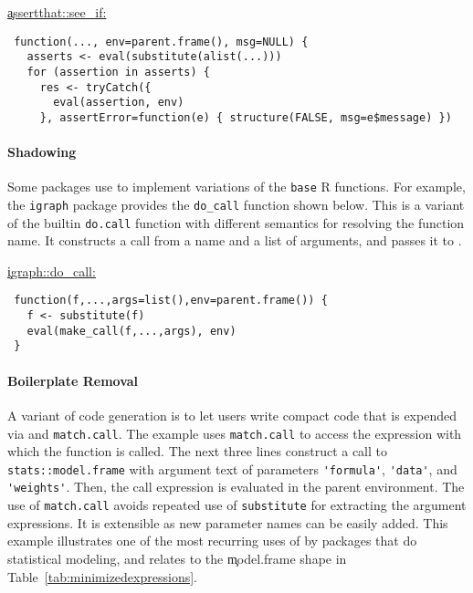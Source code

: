 \documentclass[review,screen,acmsmall]{acmart}%
\renewcommand{\k}[1]{\lstinline |#1|\xspace}
\begin{document}
\begin{minipage}{.95\textwidth}
  \medskip\underline{\c {assertthat::see\_if}:}
\begin{lstlisting}
 function(..., env=parent.frame(), msg=NULL) {
   asserts <- eval(substitute(alist(...)))
   for (assertion in asserts) {
     res <- tryCatch({
       eval(assertion, env)
     }, assertError=function(e) { structure(FALSE, msg=e$message) })
\end{lstlisting}\medskip
\end{minipage}

\paragraph{Shadowing}
Some packages use \eval to implement variations of the \k{base} R functions.
For example, the \k{igraph} package provides the \k{do_call} function shown
below. This is a variant of the builtin \k{do.call} function with different
semantics for resolving the function name.
It constructs a call from a name and a list of arguments, and passes it to \eval.

\begin{minipage}{.95\textwidth}
  \medskip\underline{\c{igraph::do\_call}:}
\begin{lstlisting}
 function(f,...,args=list(),env=parent.frame()) {
   f <- substitute(f)
   eval(make_call(f,...,args), env)
 }
\end{lstlisting}\medskip
\end{minipage}

\paragraph{Boilerplate Removal} 
A variant of code generation is to let users write compact code that is expended
via \eval and \k{match.call}. The example uses \k{match.call} to access the
expression with which the function is called. The next three lines construct a
call to \k{stats::model.frame} with argument text of parameters \k{'formula'},
\k{'data'}, and \k{'weights'}. Then, the call expression is evaluated in the
parent environment. The use of \k{match.call} avoids repeated use of
\k{substitute} for extracting the argument expressions. It is extensible as new
parameter names can be easily added. This example illustrates one of the most
recurring uses of \eval by packages that do statistical modeling, and relates to
the \c{model.frame} shape in Table~\ref{tab:minimizedexpressions}.
\end{document}
